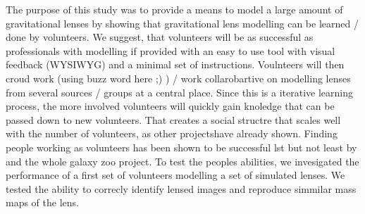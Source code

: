 The purpose of this study was to provide a means to model a large amount of gravitational lenses by showing that gravitational lens modelling can be learned / done by volunteers.
We suggest, that volunteers will be as successful as professionals with modelling if provided with an easy to use tool with visual feedback (WYSIWYG) and a minimal set of instructions.
Voulnteers will then croud work (using buzz word here ;) ) / work collarobartive on modelling lenses from several sources / groups at a central place.
Since this is a iterative learning process, the more involved volunteers will quickly gain knoledge that can be passed down to new volunteers.
That creates a social structre that scales well with the number of volunteers, as other projects\needcite have already shown.
Finding people working as volunteers has been shown to be successful lst but not least by \sw and the whole galaxy zoo project.
To test the peoples abilities, we invesigated the performance of a first set of volunteers modelling a set of simulated lenses.
We tested the ability to correcly identify lensed images and reproduce simmilar mass maps of the lens.
